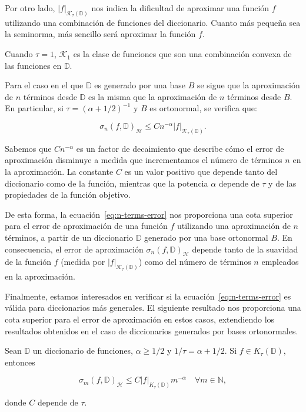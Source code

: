 Por otro lado, $|f|_{\mathcal{K}_{\tau}(\mathbb{D})}$ nos indica la dificultad de aproximar una función $f$ utilizando una combinación de funciones del diccionario. Cuanto más pequeña sea la seminorma, más sencillo será aproximar la función $f$.

\begin{observacion}
    Cuando $\tau = 1$, $\mathcal{K}_1$ es la clase de funciones que son una combinación convexa de las funciones en $\mathbb{D}$.
\end{observacion}

Para el caso en el que $\mathbb{D}$ es generado por una base $B$ se sigue que la aproximación de $n$ términos desde $\mathbb{D}$ es la misma que la aproximación de $n$ términos desde $B$. En particular, si $\tau = (\alpha + 1/2)^{-1}$ y $B$ es ortonormal, se verifica que:

\begin{equation}\label{eq:n-terms-error}
    \sigma_n(f, \mathbb{D})_{\mathcal{H}} \leq Cn^{-\alpha} |f|_{\mathcal{K}_{\tau}(\mathbb{D})}.
\end{equation}

Sabemos que $Cn^{-\alpha}$ es un factor de decaimiento que describe cómo el error de aproximación disminuye a medida que incrementamos el número de términos $n$ en la aproximación. La constante $C$ es un valor positivo que depende tanto del diccionario como de la función, mientras que la potencia $\alpha$ depende de $\tau$ y de las propiedades de la función objetivo.

De esta forma, la ecuación~\eqref{eq:n-terms-error} nos proporciona una cota superior para el error de aproximación de una función $f$ utilizando una aproximación de $n$ términos, a partir de un diccionario $\mathbb{D}$ generado por una base ortonormal $B$. En consecuencia, el error de aproximación $\sigma_n(f, \mathbb{D})_{\mathcal{H}}$ depende tanto de la suavidad de la función $f$ (medida por $|f|_{\mathcal{K}_{\tau}(\mathbb{D})}$) como del número de términos $n$ empleados en la aproximación.

Finalmente, estamos interesados en verificar si la ecuación~\eqref{eq:n-terms-error} es válida para diccionarios más generales. El siguiente resultado nos proporciona una cota superior para el error de aproximación en estos casos, extendiendo los resultados obtenidos en el caso de diccionarios generados por bases ortonormales.

\begin{teorema}
    Sean $\mathbb{D}$ un diccionario de funciones, $\alpha \geq 1/2$ y $1/\tau = \alpha + 1/2$. Si $f \in K_{\tau}(\mathbb{D})$, entonces

    \begin{equation}\label{eq:n-terms-teo}
        \sigma_m(f, \mathbb{D})_{\mathcal{H}} \leq C |f|_{K_{\tau}(\mathbb{D})} m^{-\alpha} \quad \forall m \in \mathbb{N},
    \end{equation}

    donde $C$ depende de $\tau$.
\end{teorema}

